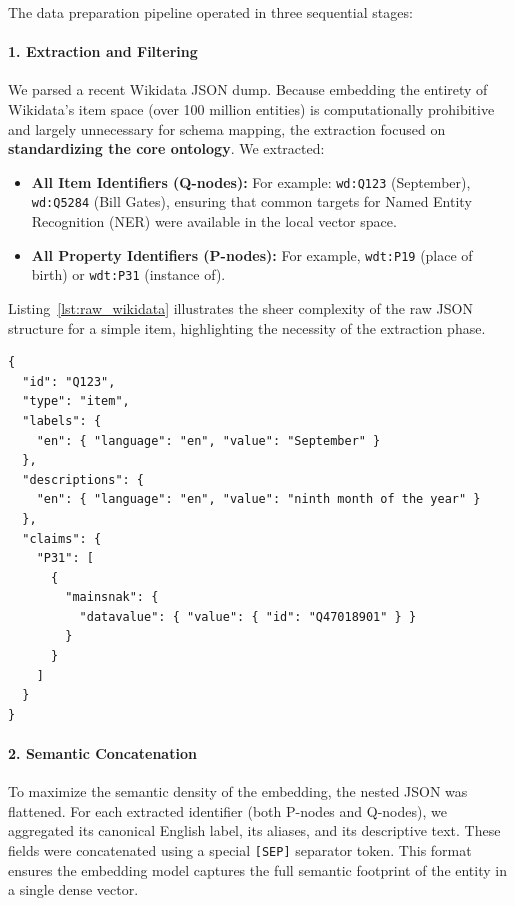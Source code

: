 The data preparation pipeline operated in three sequential stages:

\paragraph{1. Extraction and Filtering}
We parsed a recent Wikidata JSON dump. Because embedding the entirety of Wikidata's item space (over 100 million entities) is computationally prohibitive and largely unnecessary for schema mapping, the extraction focused on \textbf{standardizing the core ontology}. We extracted:
\begin{itemize}
   \item \textbf{All Item Identifiers (Q-nodes):} For example: \texttt{wd:Q123} (September), \texttt{wd:Q5284} (Bill Gates), ensuring that common targets for Named Entity Recognition (NER) were available in the local vector space.
    \item \textbf{All Property Identifiers (P-nodes):} For example, \texttt{wdt:P19} (place of birth) or \texttt{wdt:P31} (instance of).
\end{itemize}

Listing~\ref{lst:raw_wikidata} illustrates the sheer complexity of the raw JSON structure for a simple item, highlighting the necessity of the extraction phase.

\begin{lstlisting}[basicstyle=\ttfamily\footnotesize, frame=single, caption={Snippet of Raw Wikidata JSON structure (highly nested and verbose).}, label={lst:raw_wikidata}]
{
  "id": "Q123",
  "type": "item",
  "labels": {
    "en": { "language": "en", "value": "September" }
  },
  "descriptions": {
    "en": { "language": "en", "value": "ninth month of the year" }
  },
  "claims": {
    "P31": [ 
      {
        "mainsnak": { 
          "datavalue": { "value": { "id": "Q47018901" } } 
        }
      } 
    ]
  }
}
\end{lstlisting}

\paragraph{2. Semantic Concatenation}
To maximize the semantic density of the embedding, the nested JSON was flattened. For each extracted identifier (both P-nodes and Q-nodes), we aggregated its canonical English label, its aliases, and its descriptive text. These fields were concatenated using a special \texttt{[SEP]} separator token. This format ensures the embedding model captures the full semantic footprint of the entity in a single dense vector.

